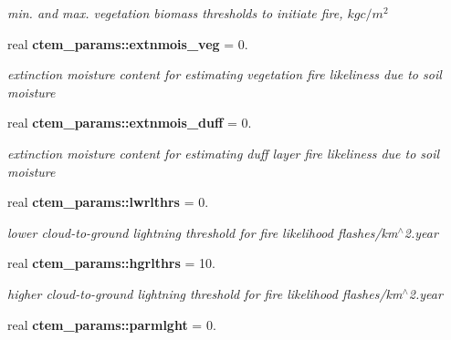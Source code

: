 \begin{DoxyCompactItemize}
\begin{DoxyCompactList}\small\item\em min. and max. vegetation biomass thresholds to initiate fire, $kg c/m^2$ \end{DoxyCompactList}\item 
\hypertarget{namespacectem__params_a79ef480de23397cf798e7350991780f3}{}real {\bfseries ctem\+\_\+params\+::extnmois\+\_\+veg} = 0.\label{namespacectem__params_a79ef480de23397cf798e7350991780f3}

\begin{DoxyCompactList}\small\item\em extinction moisture content for estimating vegetation fire likeliness due to soil moisture \end{DoxyCompactList}\item 
\hypertarget{namespacectem__params_a5783396d006dd77848beec6e321443b7}{}real {\bfseries ctem\+\_\+params\+::extnmois\+\_\+duff} = 0.\label{namespacectem__params_a5783396d006dd77848beec6e321443b7}

\begin{DoxyCompactList}\small\item\em extinction moisture content for estimating duff layer fire likeliness due to soil moisture \end{DoxyCompactList}\item 
\hypertarget{namespacectem__params_a4e6ad236fa1a30bbc7841a03cce0fb37}{}real {\bfseries ctem\+\_\+params\+::lwrlthrs} = 0.\label{namespacectem__params_a4e6ad236fa1a30bbc7841a03cce0fb37}

\begin{DoxyCompactList}\small\item\em lower cloud-\/to-\/ground lightning threshold for fire likelihood flashes/km$^\wedge$2.year \end{DoxyCompactList}\item 
\hypertarget{namespacectem__params_a2ec617391422478c2c13c4215060b759}{}real {\bfseries ctem\+\_\+params\+::hgrlthrs} = 10.\label{namespacectem__params_a2ec617391422478c2c13c4215060b759}

\begin{DoxyCompactList}\small\item\em higher cloud-\/to-\/ground lightning threshold for fire likelihood flashes/km$^\wedge$2.year \end{DoxyCompactList}\item 
\hypertarget{namespacectem__params_a689825245070f06cb1156044940af148}{}real {\bfseries ctem\+\_\+params\+::parmlght} = 0.\label{namespacectem__params_a689825245070f06cb1156044940af148}


\end{DoxyCompactItemize}
